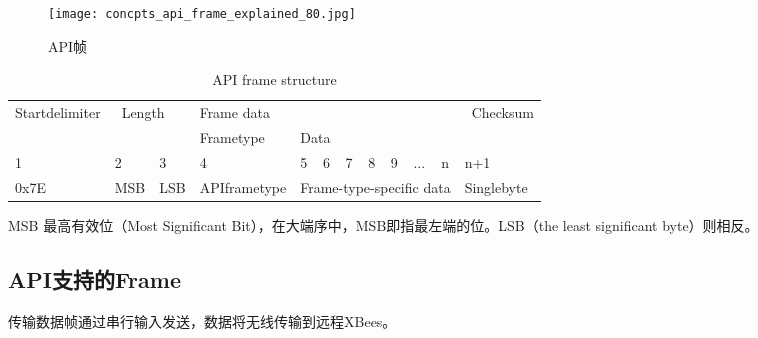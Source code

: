 



\begin{figure}[htbp]
    \centering
    \texttt{[image: concpts\_api\_frame\_explained\_80.jpg]}
    \caption{API帧}
    \label{fig:api-frame}
\end{figure}

\begin{table}[htbp]
    \centering
    \begin{tabular}{l|l|l|l|l|l|l|l|l|l|l|l} 
    \toprule
    Startdelimiter & \multicolumn{2}{l|}{~Length} & \multicolumn{8}{l|}{Frame data}                              & ~Checksum   \\ 
    \cline{4-11}
                   & \multicolumn{2}{l|}{}        & Frametype    & \multicolumn{7}{l|}{Data}                     &             \\ 
    \midrule
    1              & 2   & 3                      & 4            & 5 & 6 & 7 & 8 & 9 & ... & n                   & n+1         \\ 
    \cline{1-3}\cline{5-12}
    0x7E           & MSB & LSB                    & APIframetype & \multicolumn{7}{l|}{Frame-type-specific data} & Singlebyte  \\
    \bottomrule
    \end{tabular}
    \caption{API frame structure}
    \label{tab:API-frame-structure}
\end{table}

MSB 最高有效位（Most Significant Bit），在大端序中，MSB即指最左端的位。LSB（the least significant byte）则相反。

\subsection{API支持的Frame}

传输数据帧通过串行输入发送，数据将无线传输到远程XBees。


